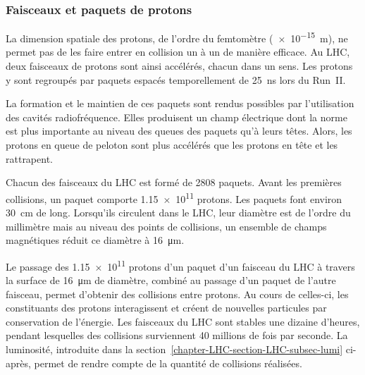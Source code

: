 \subsubsection{Faisceaux et paquets de protons}
La dimension spatiale des protons, de l'ordre du femtomètre (\SI{e-15}{\meter}), ne permet pas de les faire entrer en collision un à un de manière efficace.
Au LHC, deux faisceaux de protons sont ainsi accélérés, chacun dans un sens.
Les protons y sont regroupés par paquets espacés temporellement de \SI{25}{\nano\second} lors du Run~II.
\par La formation et le maintien de ces paquets sont rendus possibles par l'utilisation des cavités radiofréquence.
Elles produisent un champ électrique dont la norme est plus importante au niveau des queues des paquets qu'à leurs têtes.
Alors, les protons \og en queue de peloton \fg{} sont plus accélérés que les protons en tête et les rattrapent.
\par
Chacun des faisceaux du LHC est formé de 2808 paquets.
Avant les premières collisions, un paquet comporte \num{1.15e11} protons.
Les paquets font environ \SI{30}{\centi\meter} de long.
Lorsqu'ils circulent dans le LHC, leur diamètre est de l'ordre du millimètre mais au niveau des points de collisions, un ensemble de champs magnétiques réduit ce diamètre à \SI{16}{\micro\meter}.
\par Le passage des \num{1.15e11} protons d'un paquet d'un faisceau du LHC à travers la surface de \SI{16}{\micro\meter} de diamètre, combiné au passage d'un paquet de l'autre faisceau, permet d'obtenir des collisions entre protons.
Au cours de celles-ci, les constituants des protons interagissent et créent de nouvelles particules par conservation de l'énergie.
Les faisceaux du LHC sont stables une dizaine d'heures, pendant lesquelles des collisions surviennent 40 millions de fois par seconde.
La luminosité, introduite dans la section~\ref{chapter-LHC-section-LHC-subsec-lumi} ci-après, permet de rendre compte de la quantité de collisions réalisées.
